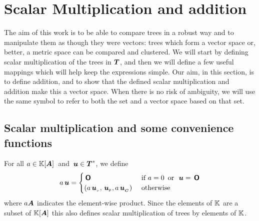 

\section{Scalar Multiplication and addition}

The aim of this work is to be able to compare trees in a robust way
and to manipulate them as though they were vectors: trees which form
a vector space or, better, a metric space can be compared and
clustered. We will start by defining scalar multiplication of the trees in
$\boldsymbol{T}$, and then we will define a few useful mappings which will help
keep the expressions simple. Our aim, in this section, is to define
addition, and to show that the defined scalar multiplication and
addition make this a vector space. When there is no risk of ambiguity,
we will use the same symbol to refer to both the set and
a vector space based on that set.

\subsection{Scalar multiplication and some convenience functions}
\begin{definition}
  For all \(a \in \mathbb{K}[{\boldsymbol{A}}]\)\ and \(\,\boldsymbol{u} \in \boldsymbol{T}^*\), we
  define
  \begin{align*}
      a \,\boldsymbol{u} = \begin{cases}
        \,\boldsymbol{\mathsf{O}}  & \text{ if } a = 0 \operatorname{\text{~or~}} \,\boldsymbol{u} = \,\boldsymbol{\mathsf{O}} \\
        (a {\,\boldsymbol{u}}_{{}_{v}}, {\,\boldsymbol{u}}_{{}_{\mathsf{P}}}, a{\,\boldsymbol{u}}_{{}_{\boldsymbol{C}}}) & \text{ otherwise }
      \end{cases}
  \end{align*}
  where $a\boldsymbol{A}$ indicates the element-wise product.  Since the
  elements of $\mathbb{K}$ are a subset of $\mathbb{K}[{\boldsymbol{A}}]$ this also defines scalar
  multiplication of trees by elements of $\mathbb{K}$.
\end{definition}

